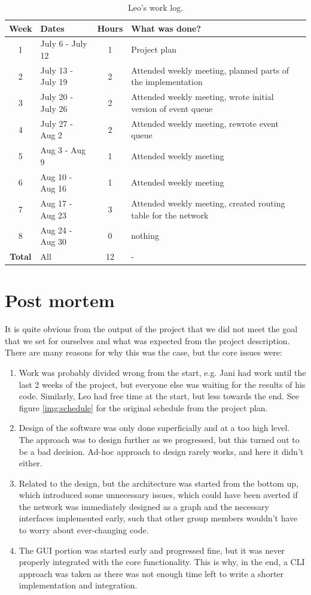 \begin{table}[!htbp]
\footnotesize{
\begin{tabular}{c|p{}|c|p{}}
\textbf{Week} & \textbf{Dates} & \textbf{Hours} & \textbf{What was done?} \\
\hline 1 & July 6 - July 12     & 1 & Project plan \\
\hline 2 & July 13 - July 19    & 2 & Attended weekly meeting, planned parts of the implementation \\
\hline 3 & July 20 - July 26    & 2 & Attended weekly meeting, wrote initial version of event queue \\
\hline 4 & July 27 - Aug 2      & 2 & Attended weekly meeting, rewrote event queue \\
\hline 5 & Aug 3 - Aug 9        & 1 & Attended weekly meeting \\
\hline 6 & Aug 10 - Aug 16      & 1 & Attended weekly meeting \\
\hline 7 & Aug 17 - Aug 23      & 3 & Attended weekly meeting, created routing table for the network \\
\hline 8 & Aug 24 - Aug 30      & 0 & nothing \\
\hline\hline\textbf{Total}&All  & 12 & - \\
\end{tabular}
}
\caption{Leo's work log. }
\label{table:worklog-leo}
\end{table}
\hfill
\section{Post mortem}
It is quite obvious from the output of the project that we did not meet the goal that we set for ourselves and what was expected from the project description. There are many reasons for why this was the case, but the core issues were:
\begin{enumerate}
    \item Work was probably divided wrong from the start, e.g. Jani had work until the last 2 weeks of the project, but everyone else was waiting for the results of his code. Similarly, Leo had free time at the start, but less towards the end. See figure \ref{img:schedule} for the original schedule from the project plan.
    \item Design of the software was only done superficially and at a too high level. The approach was to design further as we progressed, but this turned out to be a bad decision. Ad-hoc approach to design rarely works, and here it didn't either.
    \item Related to the design, but the architecture was started from the bottom up, which introduced some unnecessary issues, which could have been averted if the network was immediately designed as a graph and the necessary interfaces implemented early, such that other group members wouldn't have to worry about ever-changing code.
    \item The GUI portion was started early and progressed fine, but it was never properly integrated with the core functionality. This is why, in the end, a CLI approach was taken as there was not enough time left to write a shorter implementation and integration. 
\end{enumerate}


